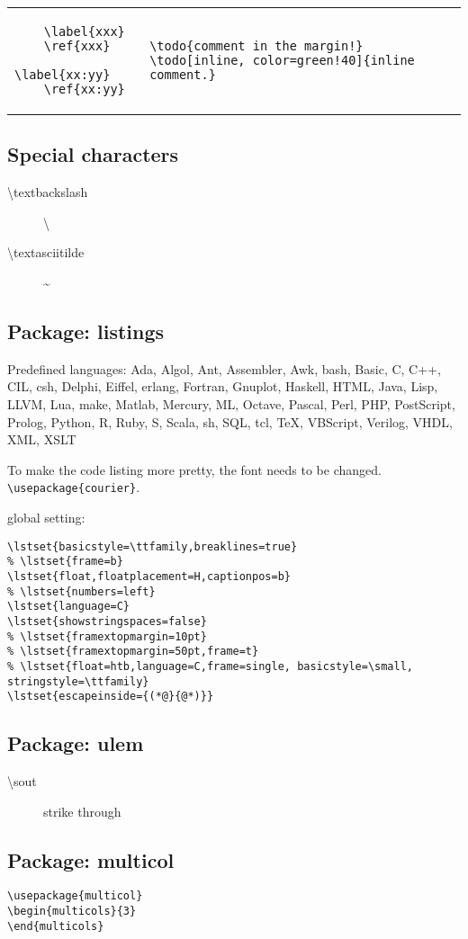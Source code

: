 \begin{tabular}{@{}l|l@{}}
  \begin{lstlisting}
    \label{xxx}
    \ref{xxx}
    \label{xx:yy}
    \ref{xx:yy}
  \end{lstlisting}&
\begin{lstlisting}
\todo{comment in the margin!}
\todo[inline, color=green!40]{inline comment.}
\end{lstlisting}
\end{tabular}

\subsection{Special characters}
\begin{description}
\item [\textbackslash textbackslash] \textbackslash
\item [\textbackslash textasciitilde] \textasciitilde
\end{description}




\subsection{Package: listings}
Predefined languages:
Ada, Algol, Ant, Assembler, Awk, bash, Basic, C, C++, CIL, csh,
Delphi, Eiffel, erlang, Fortran, Gnuplot, Haskell, HTML, Java, Lisp,
LLVM, Lua, make, Matlab, Mercury, ML, Octave, Pascal, Perl, PHP,
PostScript, Prolog, Python, R, Ruby, S, Scala, sh, SQL, tcl, TeX,
VBScript, Verilog, VHDL, XML, XSLT


To make the code listing more pretty, the font needs to be changed.
\verb$\usepackage{courier}$.

global setting:

\begin{lstlisting}
\lstset{basicstyle=\ttfamily,breaklines=true}
% \lstset{frame=b}
\lstset{float,floatplacement=H,captionpos=b}
% \lstset{numbers=left}
\lstset{language=C}
\lstset{showstringspaces=false}
% \lstset{framextopmargin=10pt}
% \lstset{framextopmargin=50pt,frame=t}
% \lstset{float=htb,language=C,frame=single, basicstyle=\small, stringstyle=\ttfamily}
\lstset{escapeinside={(*@}{@*)}}
\end{lstlisting}

\subsection{Package: ulem}

\begin{description}
\item [\textbackslash sout] strike through
\end{description}


\subsection{Package: multicol}
\begin{lstlisting}
\usepackage{multicol}
\begin{multicols}{3}
\end{multicols}
\end{lstlisting}

